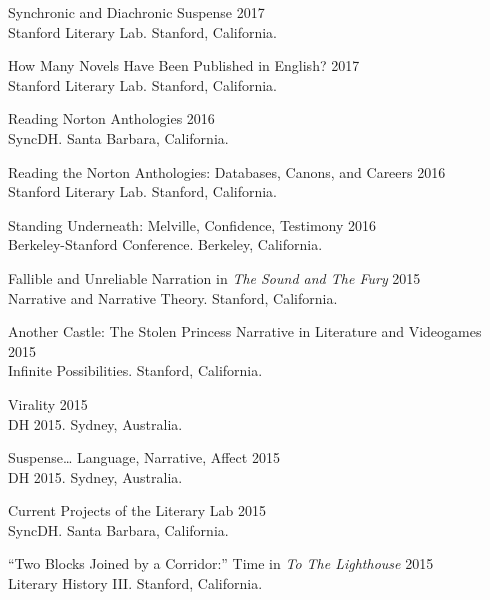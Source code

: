 \documentclass[
  12pt,
  letterpaper,
]{article}
\begin{document}
Synchronic and Diachronic Suspense \hfill 2017\\
\hspace*{0.333em} Stanford Literary Lab. Stanford, California.

How Many Novels Have Been Published in English? \hfill 2017\\
\hspace*{0.333em} Stanford Literary Lab. Stanford, California.

Reading Norton Anthologies \hfill 2016\\
\hspace*{0.333em} SyncDH. Santa Barbara, California.

Reading the Norton Anthologies: Databases, Canons, and Careers
\hfill 2016\\
\hspace*{0.333em} Stanford Literary Lab. Stanford, California.

Standing Underneath: Melville, Confidence, Testimony \hfill 2016\\
\hspace*{0.333em} Berkeley-Stanford Conference. Berkeley, California.

Fallible and Unreliable Narration in \emph{The Sound and The Fury}
\hfill 2015\\
\hspace*{0.333em} Narrative and Narrative Theory. Stanford, California.

Another Castle: The Stolen Princess Narrative in Literature and
Videogames \hfill 2015\\
\hspace*{0.333em} Infinite Possibilities. Stanford, California.

Virality \hfill 2015\\
\hspace*{0.333em} DH 2015. Sydney, Australia.

Suspense\ldots{} Language, Narrative, Affect \hfill 2015\\
\hspace*{0.333em} DH 2015. Sydney, Australia.

Current Projects of the Literary Lab \hfill 2015\\
\hspace*{0.333em} SyncDH. Santa Barbara, California.

``Two Blocks Joined by a Corridor:'' Time in \emph{To The Lighthouse}
\hfill 2015\\
\hspace*{0.333em} Literary History III. Stanford, California.
\end{document}
